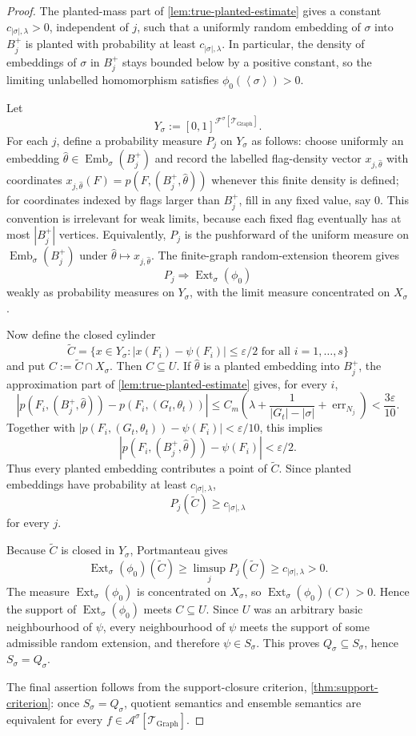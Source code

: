 \documentclass[11pt]{article}
\theoremstyle{definition}
\newcommand{\A}{\mathcal{A}}
\newcommand{\F}{\mathcal{F}}
\newcommand{\T}{\mathcal{T}}
\newcommand{\Emb}{\operatorname{Emb}}
\newcommand{\Ext}{\operatorname{Ext}}
\newcommand{\brak}[1]{\left\langle #1\right\rangle}
\newcommand{\eps}{\varepsilon}
\begin{document}
\begin{proof}
The planted-mass part of \cref{lem:true-planted-estimate} gives a constant
$c_{|\sigma|,\lambda}>0$, independent of $j$, such that a uniformly random
embedding of $\sigma$ into $B_j^+$ is planted with probability at least
$c_{|\sigma|,\lambda}$.  In particular, the density of embeddings of
$\sigma$ in $B_j^+$ stays bounded below by a positive constant, so the limiting
unlabelled homomorphism satisfies $\phi_0(\brak\sigma)>0$.

Let
\[
  Y_\sigma:=[0,1]^{\F^\sigma[\T_{\mathrm{Graph}}]}.
\]
For each $j$, define a probability measure $P_j$ on $Y_\sigma$ as follows:
choose uniformly an embedding
$\widehat\theta\in\Emb_\sigma(B_j^+)$ and record the labelled flag-density vector
$x_{j,\widehat\theta}$ with coordinates
$x_{j,\widehat\theta}(F)=p(F,(B_j^+,\widehat\theta))$ whenever this finite
density is defined; for coordinates indexed by flags larger than $B_j^+$, fill
in any fixed value, say $0$.  This convention is irrelevant for weak limits,
because each fixed flag eventually has at most $|B_j^+|$ vertices.
Equivalently, $P_j$ is the pushforward of the uniform measure on
$\Emb_\sigma(B_j^+)$ under
$\widehat\theta\mapsto x_{j,\widehat\theta}$.  The finite-graph random-extension
theorem gives
\[
  P_j \Rightarrow \Ext_\sigma(\phi_0)
\]
weakly as probability measures on $Y_\sigma$, with the limit measure
concentrated on $X_\sigma$.

Now define the closed cylinder
\[
  \widetilde C=
  \{x\in Y_\sigma:
    |x(F_i)-\psi(F_i)|\le\eps/2\text{ for all }i=1,\ldots,s\}
\]
and put $C:=\widetilde C\cap X_\sigma$.  Then $C\subseteq U$.  If
$\widehat\theta$ is a planted embedding into $B_j^+$, the approximation part of
\cref{lem:true-planted-estimate} gives, for every $i$,
\[
  |p(F_i,(B_j^+,\widehat\theta))-p(F_i,(G_t,\theta_t))|
  \le
  C_m\left(\lambda+\frac1{|G_t|-|\sigma|}
      +\operatorname{err}_{N_j}\right)
  < \frac{3\eps}{10}.
\]
Together with
$|p(F_i,(G_t,\theta_t))-\psi(F_i)|<\eps/10$, this implies
\[
  |p(F_i,(B_j^+,\widehat\theta))-\psi(F_i)|<\eps/2 .
\]
Thus every planted embedding contributes a point of $\widetilde C$.  Since
planted embeddings have probability at least $c_{|\sigma|,\lambda}$,
\[
  P_j(\widetilde C)\ge c_{|\sigma|,\lambda}
\]
for every $j$.

Because $\widetilde C$ is closed in $Y_\sigma$, Portmanteau gives
\[
  \Ext_\sigma(\phi_0)(\widetilde C)
  \ge
  \limsup_j P_j(\widetilde C)
  \ge
  c_{|\sigma|,\lambda}>0 .
\]
The measure $\Ext_\sigma(\phi_0)$ is concentrated on $X_\sigma$, so
$\Ext_\sigma(\phi_0)(C)>0$.  Hence the support of
$\Ext_\sigma(\phi_0)$ meets $C\subseteq U$.  Since $U$ was an arbitrary basic
neighbourhood of $\psi$, every neighbourhood of $\psi$ meets the support of some
admissible random extension, and therefore $\psi\in S_\sigma$.  This proves
$Q_\sigma\subseteq S_\sigma$, hence $S_\sigma=Q_\sigma$.

The final assertion follows from the support-closure criterion,
\cref{thm:support-criterion}: once $S_\sigma=Q_\sigma$, quotient semantics and
ensemble semantics are equivalent for every
$f\in\A^\sigma[\T_{\mathrm{Graph}}]$.
\end{proof}
\end{document}
